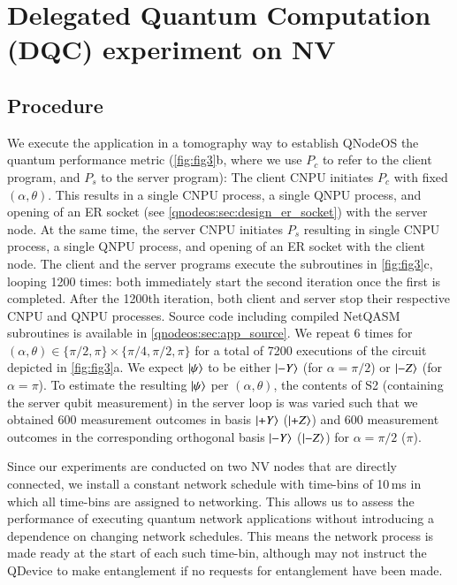 \section{Delegated Quantum Computation (DQC) experiment on NV}
\label{qnodeos:sec:delcomp}

\subsection{Procedure}

We execute the application in a tomography way to establish \ac{QNodeOS} the quantum performance metric (\cref{fig:fig3}b, where we use $P_c$ to refer to the client program, and $P_s$ to the server program): The client \ac{CNPU} initiates $P_c$ with fixed $(\alpha, \theta)$. This results in a single \ac{CNPU} process, a single \ac{QNPU} process, and opening of an \ac{ER} socket (see \cref{qnodeos:sec:design_er_socket}) with the server node. At the same time, the server \ac{CNPU} initiates $P_s$ resulting in single \ac{CNPU} process, a single \ac{QNPU} process, and opening of an \ac{ER} socket with the client node. The client and the server programs execute the subroutines in \cref{fig:fig3}c, looping 1200 times: both immediately start the second iteration once the first is completed. After the 1200th iteration, both client and server stop their respective \ac{CNPU} and \ac{QNPU} processes. Source code including compiled NetQASM subroutines is available in \cref{qnodeos:sec:app_source}. We repeat 6 times for $(\alpha, \theta) \in \{\pi/2, \pi\} \times \{\pi/4, \pi/2, \pi\}$ for a total of 7200 executions of the circuit depicted in \cref{fig:fig3}a. We expect $\ket{\psi}$ to be either $\ket{-Y}$ (for $\alpha = \pi/2$) or $\ket{-Z}$ (for $\alpha = \pi$). To estimate the resulting $\ket{\psi}$ per $(\alpha, \theta)$, the contents of S2 (containing the server qubit measurement) in the server loop is was varied such that we obtained 600 measurement outcomes in basis $\ket{+Y}$ ($\ket{+Z}$) and 600 measurement outcomes in the corresponding orthogonal basis $\ket{-Y}$ ($\ket{-Z}$) for $\alpha = \pi/2$ ($\pi$).

Since our experiments are conducted on two \ac{NV} nodes that are directly connected, we install a constant network schedule with time-bins of 10\,ms in which all time-bins are assigned to networking. This allows us to assess the performance of executing quantum network applications without introducing a dependence on changing network schedules. This means the network process is made ready at the start of each such time-bin, although may not instruct the \ac{QDevice} to make entanglement if no requests for entanglement have been made.

